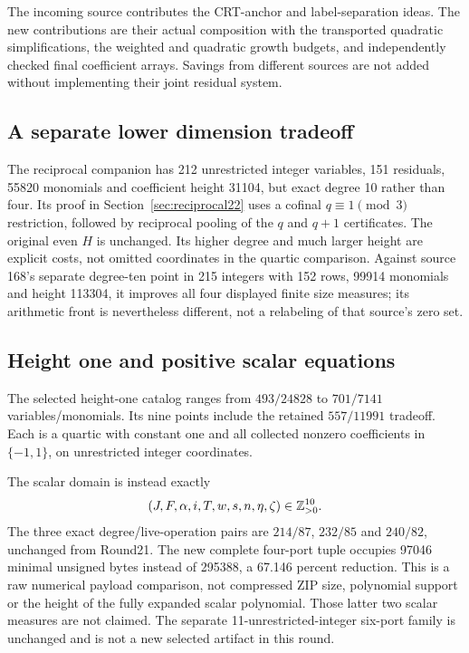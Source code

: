 The incoming source contributes the CRT-anchor and label-separation ideas.
The new contributions are their actual composition with the transported
quadratic simplifications, the weighted and quadratic growth budgets,
and independently checked final coefficient arrays. Savings from different
sources are not added without implementing their joint residual system.

\subsection{A separate lower dimension tradeoff}
The reciprocal companion has 212 unrestricted integer variables, 151 residuals,
55820 monomials and coefficient height 31104, but exact degree 10 rather
than four. Its proof in Section~\ref{sec:reciprocal22} uses a cofinal
$q\equiv1\pmod3$ restriction, followed by reciprocal pooling of the
$q$ and $q+1$ certificates. The original even $H$ is unchanged. Its
higher degree and much larger height are explicit costs, not omitted
coordinates in the quartic comparison. Against source 168's separate
degree-ten point in 215 integers with 152 rows, 99914 monomials and
height 113304, it improves all four displayed finite size measures;
its arithmetic front is nevertheless different, not a relabeling of
that source's zero set.

\subsection{Height one and positive scalar equations}
The selected height-one catalog ranges from $493/24828$ to $701/7141$
variables/monomials. Its nine points include the retained $557/11991$
tradeoff. Each is a quartic with constant one and all collected nonzero
coefficients in $\{-1,1\}$, on unrestricted integer coordinates.

The scalar domain is instead exactly
\[
 (J,F,\alpha,i,T,w,s,n,\eta,\zeta)\in\mathbb Z_{>0}^{10}.
\]
The three exact degree/live-operation pairs are $214/87$, $232/85$ and
$240/82$, unchanged from Round21. The new complete four-port tuple occupies
97046 minimal unsigned bytes instead of 295388, a 67.146 percent reduction.
This is a raw numerical payload comparison, not compressed ZIP size,
polynomial support or the height of the fully expanded scalar polynomial.
Those latter two scalar measures are not claimed. The separate
11-unrestricted-integer six-port family is unchanged and is not a new
selected artifact in this round.
